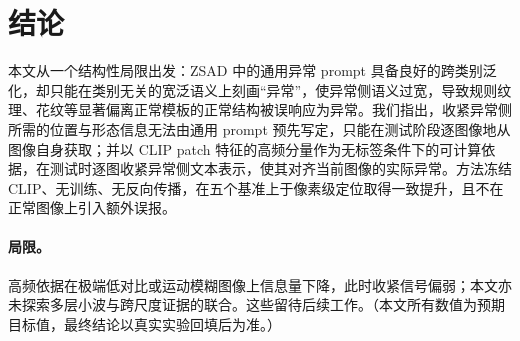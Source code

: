 \section{结论}
\label{sec:conclusion}

本文从一个结构性局限出发：ZSAD 中的通用异常 prompt 具备良好的跨类别泛化，却只能在类别无关的宽泛语义上刻画“异常”，使异常侧语义过宽，导致规则纹理、花纹等显著偏离正常模板的正常结构被误响应为异常。我们指出，收紧异常侧所需的位置与形态信息无法由通用 prompt 预先写定，只能在测试阶段逐图像地从图像自身获取；并以 CLIP patch 特征的高频分量作为无标签条件下的可计算依据，在测试时逐图收紧异常侧文本表示，使其对齐当前图像的实际异常。方法冻结 CLIP、无训练、无反向传播，在五个基准上于像素级定位取得一致提升，且不在正常图像上引入额外误报。

\paragraph{局限。}
高频依据在极端低对比或运动模糊图像上信息量下降，此时收紧信号偏弱；本文亦未探索多层小波与跨尺度证据的联合。这些留待后续工作。（本文所有数值为预期目标值，最终结论以真实实验回填后为准。）

